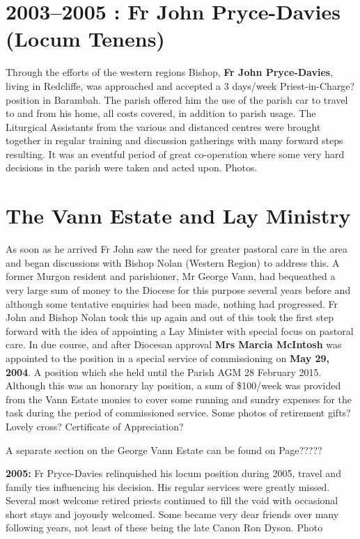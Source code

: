 \section{2003--2005 : Fr John Pryce-Davies (Locum
Tenens)}

Through the efforts of the western regions Bishop, \textbf{Fr John
Pryce-Davies}, living in Redcliffe, was approached and accepted a 3
days/week Priest-in-Charge? position in Barambah. The parish offered him
the use of the parish car to travel to and from his home, all costs
covered, in addition to parish usage. The Liturgical Assistants from the
various and distanced centres were brought together in regular training
and discussion gatherings with many forward steps resulting. It was an
eventful period of great co-operation where some very hard decisions in
the parish were taken and acted upon. Photos.

\section{The Vann Estate and Lay
Ministry}

As soon as he arrived Fr John saw the need for greater pastoral care in
the area and began discussions with Bishop Nolan (Western Region) to
address this. A former Murgon resident and parishioner, Mr George Vann,
had bequeathed a very large sum of money to the Diocese for this purpose
several years before and although some tentative enquiries had been
made, nothing had progressed. Fr John and Bishop Nolan took this up
again and out of this took the first step forward with the idea of
appointing a Lay Minister with special focus on pastoral care. In due
course, and after Diocesan approval \textbf{Mrs Marcia McIntosh} was
appointed to the position in a special service of commissioning on
\textbf{May 29, 2004}. A position which she held until the Parish AGM 28
February 2015. Although this was an honorary lay position, a sum of
\$100/week was provided from the Vann Estate monies to cover some
running and sundry expenses for the task during the period of
commissioned service. Some photos of retirement gifts? Lovely cross?
Certificate of Appreciation?

A separate section on the George Vann Estate can be found on Page?????

\textbf{2005:} Fr Pryce-Davies relinquished his locum position during
2005, travel and family ties influencing his decision. His regular
services were greatly missed. Several most welcome retired priests
continued to fill the void with occasional short stays and joyously
welcomed. Some became very dear friends over many following years, not
least of these being the late Canon Ron Dyson. Photo

